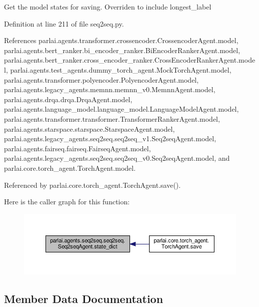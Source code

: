 \begin{DoxyVerb}Get the model states for saving. Overriden to include longest_label\end{DoxyVerb}
 

Definition at line 211 of file seq2seq.\+py.



References parlai.\+agents.\+transformer.\+crossencoder.\+Crossencoder\+Agent.\+model, parlai.\+agents.\+bert\+\_\+ranker.\+bi\+\_\+encoder\+\_\+ranker.\+Bi\+Encoder\+Ranker\+Agent.\+model, parlai.\+agents.\+bert\+\_\+ranker.\+cross\+\_\+encoder\+\_\+ranker.\+Cross\+Encoder\+Ranker\+Agent.\+model, parlai.\+agents.\+test\+\_\+agents.\+dummy\+\_\+torch\+\_\+agent.\+Mock\+Torch\+Agent.\+model, parlai.\+agents.\+transformer.\+polyencoder.\+Polyencoder\+Agent.\+model, parlai.\+agents.\+legacy\+\_\+agents.\+memnn.\+memnn\+\_\+v0.\+Memnn\+Agent.\+model, parlai.\+agents.\+drqa.\+drqa.\+Drqa\+Agent.\+model, parlai.\+agents.\+language\+\_\+model.\+language\+\_\+model.\+Language\+Model\+Agent.\+model, parlai.\+agents.\+transformer.\+transformer.\+Transformer\+Ranker\+Agent.\+model, parlai.\+agents.\+starspace.\+starspace.\+Starspace\+Agent.\+model, parlai.\+agents.\+legacy\+\_\+agents.\+seq2seq.\+seq2seq\+\_\+v1.\+Seq2seq\+Agent.\+model, parlai.\+agents.\+fairseq.\+fairseq.\+Fairseq\+Agent.\+model, parlai.\+agents.\+legacy\+\_\+agents.\+seq2seq.\+seq2seq\+\_\+v0.\+Seq2seq\+Agent.\+model, and parlai.\+core.\+torch\+\_\+agent.\+Torch\+Agent.\+model.



Referenced by parlai.\+core.\+torch\+\_\+agent.\+Torch\+Agent.\+save().

Here is the caller graph for this function\+:
\nopagebreak
\begin{figure}[H]
\begin{center}
\leavevmode
\includegraphics[width=350pt]{classparlai_1_1agents_1_1seq2seq_1_1seq2seq_1_1Seq2seqAgent_a7b68df3db0fcadb70a97a28ec2617cb2_icgraph}
\end{center}
\end{figure}


\subsection{Member Data Documentation}
\mbox{\label{classparlai_1_1agents_1_1seq2seq_1_1seq2seq_1_1Seq2seqAgent_a5254266798a52da5d4df057f5d8dc213}} 
